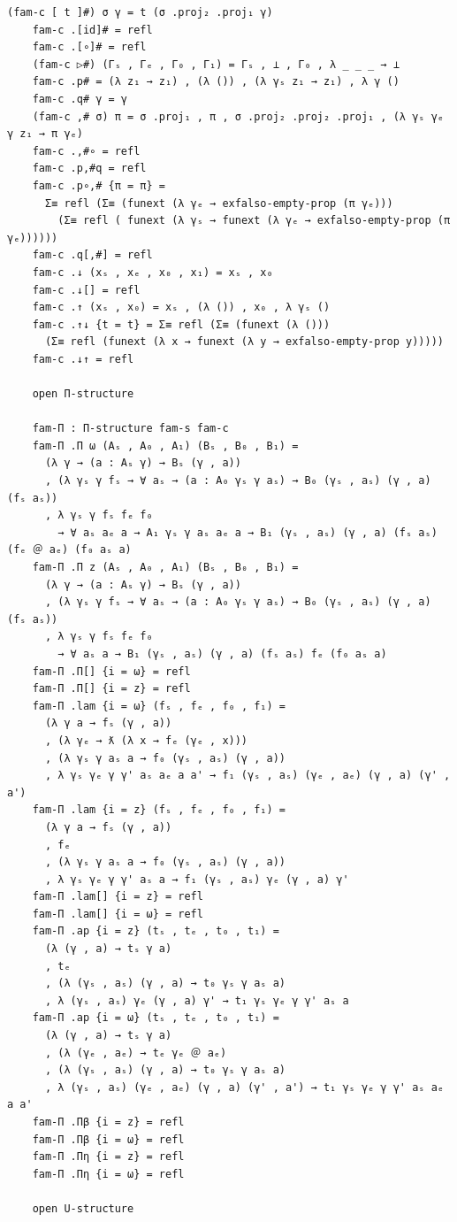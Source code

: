{\begin{Verbatim}[breaklines=true,breakanywhere=true,fontsize=\scriptsize]
    (fam-c [ t ]#) σ γ = t (σ .proj₂ .proj₁ γ)
    fam-c .[id]# = refl
    fam-c .[∘]# = refl
    (fam-c ▷#) (Γₛ , Γₑ , Γ₀ , Γ₁) = Γₛ , ⊥ , Γ₀ , λ _ _ _ → ⊥
    fam-c .p# = (λ z₁ → z₁) , (λ ()) , (λ γₛ z₁ → z₁) , λ γ ()
    fam-c .q# γ = γ
    (fam-c ,# σ) π = σ .proj₁ , π , σ .proj₂ .proj₂ .proj₁ , (λ γₛ γₑ γ z₁ → π γₑ)
    fam-c .,#∘ = refl
    fam-c .p,#q = refl
    fam-c .p∘,# {π = π} =
      Σ≡ refl (Σ≡ (funext (λ γₑ → exfalso-empty-prop (π γₑ)))
        (Σ≡ refl ( funext (λ γₛ → funext (λ γₑ → exfalso-empty-prop (π γₑ))))))
    fam-c .q[,#] = refl
    fam-c .↓ (xₛ , xₑ , x₀ , x₁) = xₛ , x₀
    fam-c .↓[] = refl
    fam-c .↑ (xₛ , x₀) = xₛ , (λ ()) , x₀ , λ γₛ ()
    fam-c .↑↓ {t = t} = Σ≡ refl (Σ≡ (funext (λ ()))
      (Σ≡ refl (funext (λ x → funext (λ y → exfalso-empty-prop y)))))
    fam-c .↓↑ = refl

    open Π-structure

    fam-Π : Π-structure fam-s fam-c
    fam-Π .Π ω (Aₛ , A₀ , A₁) (Bₛ , B₀ , B₁) =
      (λ γ → (a : Aₛ γ) → Bₛ (γ , a))
      , (λ γₛ γ fₛ → ∀ aₛ → (a : A₀ γₛ γ aₛ) → B₀ (γₛ , aₛ) (γ , a) (fₛ aₛ))
      , λ γₛ γ fₛ fₑ f₀
        → ∀ aₛ aₑ a → A₁ γₛ γ aₛ aₑ a → B₁ (γₛ , aₛ) (γ , a) (fₛ aₛ) (fₑ ＠ aₑ) (f₀ aₛ a)
    fam-Π .Π z (Aₛ , A₀ , A₁) (Bₛ , B₀ , B₁) =
      (λ γ → (a : Aₛ γ) → Bₛ (γ , a))
      , (λ γₛ γ fₛ → ∀ aₛ → (a : A₀ γₛ γ aₛ) → B₀ (γₛ , aₛ) (γ , a) (fₛ aₛ))
      , λ γₛ γ fₛ fₑ f₀
        → ∀ aₛ a → B₁ (γₛ , aₛ) (γ , a) (fₛ aₛ) fₑ (f₀ aₛ a)
    fam-Π .Π[] {i = ω} = refl
    fam-Π .Π[] {i = z} = refl
    fam-Π .lam {i = ω} (fₛ , fₑ , f₀ , f₁) =
      (λ γ a → fₛ (γ , a))
      , (λ γₑ → ƛ (λ x → fₑ (γₑ , x)))
      , (λ γₛ γ aₛ a → f₀ (γₛ , aₛ) (γ , a))
      , λ γₛ γₑ γ γ' aₛ aₑ a a' → f₁ (γₛ , aₛ) (γₑ , aₑ) (γ , a) (γ' , a')
    fam-Π .lam {i = z} (fₛ , fₑ , f₀ , f₁) =
      (λ γ a → fₛ (γ , a))
      , fₑ
      , (λ γₛ γ aₛ a → f₀ (γₛ , aₛ) (γ , a))
      , λ γₛ γₑ γ γ' aₛ a → f₁ (γₛ , aₛ) γₑ (γ , a) γ' 
    fam-Π .lam[] {i = z} = refl
    fam-Π .lam[] {i = ω} = refl
    fam-Π .ap {i = z} (tₛ , tₑ , t₀ , t₁) =
      (λ (γ , a) → tₛ γ a)
      , tₑ
      , (λ (γₛ , aₛ) (γ , a) → t₀ γₛ γ aₛ a)
      , λ (γₛ , aₛ) γₑ (γ , a) γ' → t₁ γₛ γₑ γ γ' aₛ a
    fam-Π .ap {i = ω} (tₛ , tₑ , t₀ , t₁) =
      (λ (γ , a) → tₛ γ a)
      , (λ (γₑ , aₑ) → tₑ γₑ ＠ aₑ)
      , (λ (γₛ , aₛ) (γ , a) → t₀ γₛ γ aₛ a)
      , λ (γₛ , aₛ) (γₑ , aₑ) (γ , a) (γ' , a') → t₁ γₛ γₑ γ γ' aₛ aₑ a a'
    fam-Π .Πβ {i = z} = refl
    fam-Π .Πβ {i = ω} = refl
    fam-Π .Πη {i = z} = refl
    fam-Π .Πη {i = ω} = refl

    open U-structure


\end{Verbatim}}
